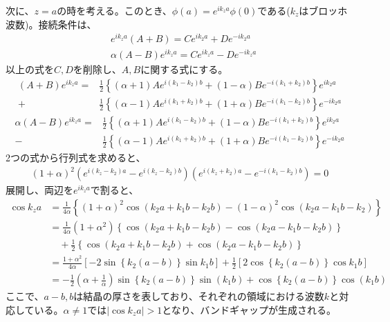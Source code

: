 \documentclass[a4paper,11pt,dvipdfmx]{jsarticle}
\begin{document}
\begin{enumerate}
  次に、$z = a$の時を考える。このとき、$\phi(a) = e^{i k_z a} \phi (0)$である($k_z$はブロッホ波数)。接続条件は、
  \begin{align*}
    & e^{i k_z a} (A + B) = C e^{i k_2 a} + D e^{- i k_2 a} \\
    & \alpha (A - B) e^{i k_z a} = C e^{i k_z a} - D e^{- i k_z a}
  \end{align*}
  以上の式を$C, D$を削除し、$A, B$に関する式にする。
  \begin{align*}
    (A + B) e^{i k_z a} = & \frac{1}{2} \left\{ \left( \alpha + 1 \right) A e^{i \left( k_1 - k_2 \right) b } + \left( 1 - \alpha \right) B e^{- i \left( k_1 + k_2 \right) b } \right\} e^{i k_2 a} 
    \\ + & \frac{1}{2} \left\{ \left( \alpha - 1 \right) A e^{i \left( k_1 + k_2 \right) b} + \left( 1 + \alpha \right) B e^{- i (k_1 - k_2)b} \right\} e^{- i k_2 a} 
  \end{align*}
  \begin{align*}
    \alpha (A - B) e^{i k_z a} = & \frac{1}{2} \left\{ \left( \alpha + 1 \right) A e^{i \left( k_1 - k_2 \right) b } + \left( 1 - \alpha \right) B e^{- i \left( k_1 + k_2 \right) b } \right\} e^{i k_2 a} 
    \\ - & \frac{1}{2} \left\{ \left( \alpha - 1 \right) A e^{i \left( k_1 + k_2 \right) b} + \left( 1 + \alpha \right) B e^{- i (k_1 - k_2)b} \right\} e^{- i k_2 a}
  \end{align*}
  2つの式から行列式を求めると、
  \begin{align*}
    (1 + \alpha)^2 \left( e^{i (k_z - k_2)a} - e^{i(k_z - k_2)b} \right) \left( e^{i (k_z + k_2)a} - e^{- i(k_1 - k_2)b} \right) = 0
  \end{align*}
  展開し、両辺を$e^{i k_z a}$で割ると、
  \begin{align*}
    \cos k_z a &= \frac{1}{4 \alpha} \left\{ (1 + \alpha)^2 \cos \left( k_2 a + k_1 b - k_2 b \right) - (1 - \alpha)^2 \cos \left( k_2 a - k_1 b - k_2 \right) \right\} 
    \\
    &= \frac{1}{4 \alpha} (1 + \alpha^2) \left\{ \cos \left( k_2 a + k_1 b - k_2 b \right) - \cos \left( k_2 a - k_1 b - k_2 b \right) \right\} 
    \\
    &\quad + \frac{1}{2} \left\{ \cos \left( k_2 a + k_1 b - k_2 b \right) + \cos \left( k_2 a - k_1 b - k_2 b \right) \right\} 
    \\
    &= \frac{1 + \alpha^2}{4 \alpha} \left[ -2 \sin \left\{ k_2 \left( a - b \right) \right\} \sin k_1 b \right] + \frac{1}{2} \left[ 2 \cos \left\{ k_2 \left( a - b \right) \right\} \cos k_1 b \right]
    \\
    &= - \frac{1}{2} \left( \alpha + \frac{1}{\alpha} \right) \sin \left\{ k_2 \left( a - b \right) \right\} \sin (k_1 b) + \cos \left\{ k_2 \left( a - b \right) \right\} \cos (k_1 b)
  \end{align*}
  ここで、$a - b, b$は結晶の厚さを表しており、それぞれの領域における波数$k$と対応している。$\alpha \neq 1$では$| \cos k_z a | > 1$となり、バンドギャップが生成される。


\end{enumerate}
\end{document}
